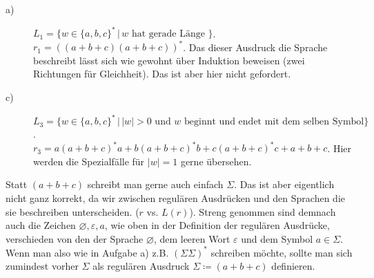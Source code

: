 \documentclass[11pt, a4paper]{article}
\let\emptyset\varnothing
\begin{document}
\begin{description}
	\item[a)] $L_1 = \{ w \in \{ a, b, c \}^\ast \,\vert\, w \text{ hat gerade Länge } \}$.\\
		$r_1 = ((a+b+c)(a+b+c))^\ast$. Das dieser Ausdruck die Sprache beschreibt lässt sich wie gewohnt über Induktion beweisen (zwei Richtungen für Gleichheit). Das ist aber hier nicht gefordert.
	\item[c)] $L_3 = \{ w \in \{ a, b, c \}^\ast \,\vert\, \left| w \right| > 0 \text{ und } w \text{ beginnt und endet mit dem selben Symbol} \}$.\\
		$r_3 = a(a+b+c)^\ast a + b(a+b+c)^\ast b + c(a+b+c)^\ast c + a + b + c$. Hier werden die Spezialfälle für $\left| w \right| = 1$ gerne übersehen.
\end{description}
Statt $(a+b+c)$ schreibt man gerne auch einfach $\Sigma$. Das ist aber eigentlich nicht ganz korrekt, da wir zwischen regulären Ausdrücken und den Sprachen die sie beschreiben unterscheiden. ($r$ vs. $L(r)$). Streng genommen sind demnach auch die Zeichen $\emptyset, \varepsilon, a$, wie oben in der Definition der regulären Ausdrücke, verschieden von den der Sprache $\emptyset$, dem leeren Wort $\varepsilon$ und dem Symbol $a \in \Sigma$. Wenn man also wie in Aufgabe a) z.B. $(\Sigma\Sigma)^\ast$ schreiben möchte, sollte man sich zumindest vorher $\Sigma$ als regulären Ausdruck $\Sigma \coloneqq (a+b+c)$ definieren.
\end{document}
